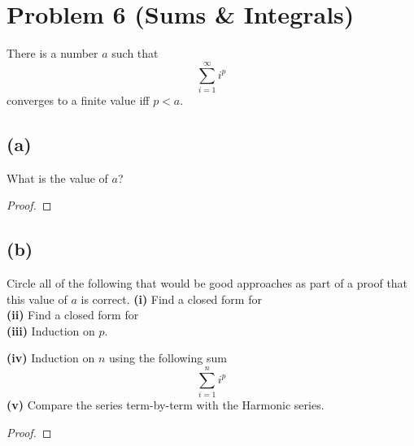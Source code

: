 \documentclass[14pt]{extarticle}
\begin{document}
\section{Problem 6 (Sums \& Integrals)}
There is a number $a$ such that
$$
\sum_{i=1}^{\infty}i^p
$$
converges to a finite value iff $p < a$.
\subsection{(a)}
What is the value of $a$?
\begin{proof}
\end{proof}

\subsection{(b)}
Circle all of the following that would be good approaches as part of a proof that this value of $a$ is correct.
{\bf (i)} Find a closed form for
$$
$$
{\bf (ii)} Find a closed form for
$$
$$
{\bf (iii)} Induction on $p$.

{\bf (iv)} Induction on $n$ using the following sum
$$
\sum_{i=1}^n i^p
$$
{\bf (v)} Compare the series term-by-term with the Harmonic series.
\begin{proof}
\end{proof}
\end{document}
